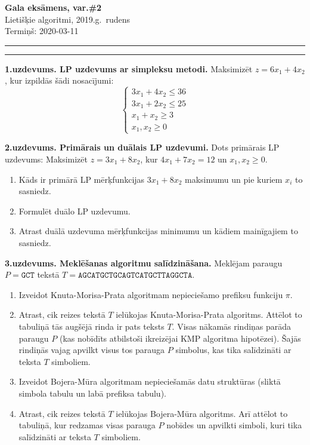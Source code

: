 \documentclass[a4paper,12pt]{article}
\begin{document}
\thispagestyle{empty}

\begin{center}
{\bf\Huge Gala eksāmens, var.\#2} \\[5pt]
Lietišķie algoritmi, 2019.g.\ rudens\\
Termiņš: 2020-03-11
\end{center}

\hrule
\vspace{2pt}
\hrule
\vspace{12pt}



\noindent
{\bf 1.uzdevums. LP uzdevums ar simpleksu metodi.}  
Maksimizēt $z = 6x_1 + 4x_2$, kur izpildās šādi nosacījumi:
$$\left\{ \begin{array}{l}
3x_1 + 4x_2 \leq 36\\
3x_1 + 2x_2 \leq 25\\
x_1 + x_2 \geq 3\\
x_1,x_2 \geq 0
\end{array} \right.$$

\vspace{6pt}
{\bf 2.uzdevums. Primārais un duālais LP uzdevumi.}
Dots primārais LP uzdevums: Maksimizēt $z = 3 x_1 + 8 x_2$, 
kur $4 x_1 + 7x_2  = 12$ un $x_1, x_2 \geq 0$. 
\begin{enumerate}[label=(\alph*)]
\item Kāds ir primārā LP mērķfunkcijas $3x_1 + 8x_2$ maksimumu un pie kuriem $x_i$ to sasniedz.
\item Formulēt duālo LP uzdevumu. 
\item Atrast duālā uzdevuma mērķfunkcijas minimumu un kādiem mainīgajiem to sasniedz.
\end{enumerate}



\vspace{6pt}
{\bf 3.uzdevums. Meklēšanas algoritmu salīdzināšana.} Meklējam paraugu $P = \mathtt{GCT}$
tekstā $T = \mathtt{AGCATGCTGCAGTCATGCTTAGGCTA}$. 
\begin{enumerate}[label=(\alph*)]
\item Izveidot Knuta-Morisa-Prata algoritmam nepieciešamo prefiksu funkciju $\pi$. 
\item Atrast, cik reizes tekstā $T$ ielūkojas
Knuta-Morisa-Prata algoritms. Attēlot to tabuliņā \textendash{} 
tās augšējā rinda ir pats teksts $T$. 
Visas nākamās rindiņas parāda paraugu $P$ (kas nobīdīts
atbilstoši ikreizējai KMP algoritma hipotēzei). 
Šajās rindiņās vajag apvilkt visus tos parauga $P$ 
simbolus, kas tika salīdzināti ar teksta $T$ simboliem. 
\item Izveidot Bojera-Mūra algoritmam nepieciešamās datu struktūras (sliktā simbola tabulu 
un labā prefiksa tabulu).
\item Atrast, cik reizes tekstā $T$ ielūkojas
Bojera-Mūra algoritms. Arī attēlot to tabuliņā, kur 
redzamas visas parauga $P$ nobīdes un apvilkti simboli, 
kuri tika salīdzināti ar teksta $T$ simboliem. 
\end{enumerate}
\end{document}
